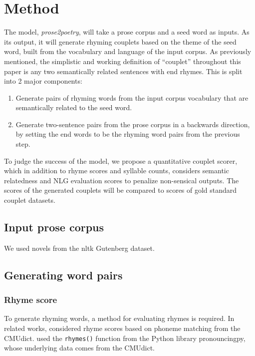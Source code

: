 \documentclass[11pt,a4paper]{article}
\begin{document}
\section{Method}
\label{sec:method}
The model, \textit{prose2poetry}, will take a prose corpus and a seed word as inputs. As its output, it will generate rhyming couplets based on the theme of the seed word, built from the vocabulary and language of the input corpus. As previously mentioned, the simplistic and working definition of ``couplet'' throughout this paper is any two semantically related sentences with end rhymes. This is split into 2 major components:
\begin{enumerate}
	\item
		Generate pairs of rhyming words from the input corpus vocabulary that are semantically related to the seed word.
	\item
		Generate two-sentence pairs from the prose corpus in a backwards direction, by setting the end words to be the rhyming word pairs from the previous step.
\end{enumerate}
To judge the success of the model, we propose a quantitative couplet scorer, which in addition to rhyme scores and syllable counts, considers semantic relatedness and NLG evaluation scores to penalize non-sensical outputs. The scores of the generated couplets will be compared to scores of gold standard couplet datasets.

\subsection{Input prose corpus}

We used novels from the nltk Gutenberg dataset.

\subsection{Generating word pairs}

\subsubsection{Rhyme score}
\label{sec:rhymescore}
To generate rhyming words, a method for evaluating rhymes is required. In related works, \citet{keswarani} considered rhyme scores based on phoneme matching from the CMUdict. \citet{cole} used the \verb|rhymes()| function from the Python library pronouncingpy, whose underlying data comes from the CMUdict.
\end{document}
